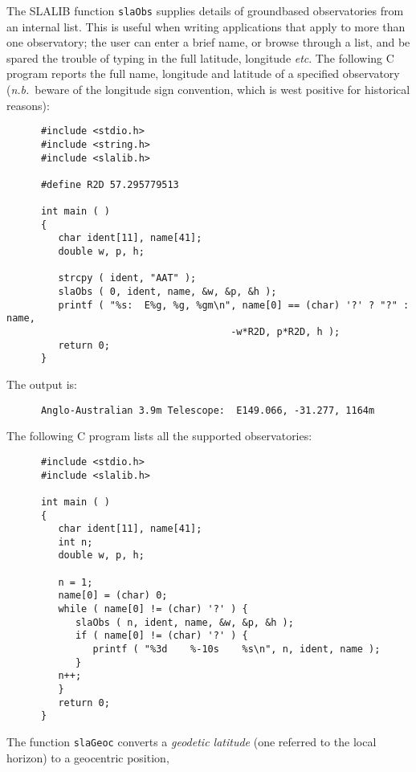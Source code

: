 \documentclass[11pt,fleqn,twoside]{article}
\renewcommand{\_}{{\tt\char'137}}     %
\begin{document}
The SLALIB function
{\tt slaObs}
supplies details of groundbased observatories from an internal
list.  This is useful when writing applications that apply to
more than one observatory;  the user can enter a brief name,
or browse through a list, and be spared the trouble of typing
in the full latitude, longitude {\it etc}.  The following
C program reports the full name, longitude and latitude
of a specified observatory
({\it n.b.}~beware of the longitude sign convention, which is west positive
for historical reasons):
\goodbreak
\vspace{-3ex}
\begin{verbatim}
      #include <stdio.h>
      #include <string.h>
      #include <slalib.h>

      #define R2D 57.295779513

      int main ( )
      {
         char ident[11], name[41];
         double w, p, h;

         strcpy ( ident, "AAT" );
         slaObs ( 0, ident, name, &w, &p, &h );
         printf ( "%s:  E%g, %g, %gm\n", name[0] == (char) '?' ? "?" : name,
                                       -w*R2D, p*R2D, h );
         return 0;
      }
\end{verbatim}
\vspace{-3ex}
\goodbreak
The output is:
\goodbreak
\vspace{-3ex}
\begin{verbatim}
      Anglo-Australian 3.9m Telescope:  E149.066, -31.277, 1164m
\end{verbatim}
\vspace{-3ex}
\goodbreak
The following C program lists all the supported observatories:
\goodbreak
\vspace{-3ex}
\begin{verbatim}
      #include <stdio.h>
      #include <slalib.h>

      int main ( )
      {
         char ident[11], name[41];
         int n;
         double w, p, h;

         n = 1;
         name[0] = (char) 0;
         while ( name[0] != (char) '?' ) {
            slaObs ( n, ident, name, &w, &p, &h );
            if ( name[0] != (char) '?' ) {
               printf ( "%3d    %-10s    %s\n", n, ident, name );
            }
         n++;
         }
         return 0;
      }
\end{verbatim}
\vspace{-3ex}
\goodbreak
The function
{\tt slaGeoc}
converts a {\it geodetic latitude}\/
(one referred to the local horizon) to a geocentric position,
\end{document}
